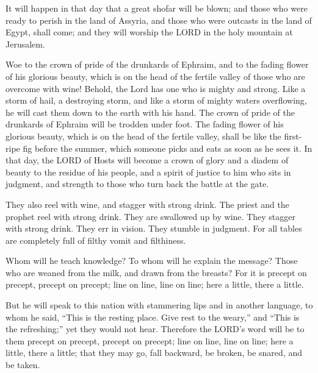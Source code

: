 \myverse{}It will happen in that day that a great shofar will be blown;
and those who were ready to perish in the land of Assyria, and those who were outcasts in the land of
Egypt, shall come; and they will worship the LORD in the holy mountain at Jerusalem.


\mychapter{} \myverse*{}Woe to the crown of pride of the drunkards of Ephraim, and to
the fading flower of his glorious beauty, which is on the head of the fertile valley of those who are
overcome with wine!
\myverse{}Behold, the Lord has one who is mighty and strong. Like a storm of hail, a
destroying storm, and like a storm of mighty waters overflowing, he will cast them down to the earth with
his hand.
\myverse{}The crown of pride of the drunkards of Ephraim will be trodden under foot.
\myverse{}The fading flower of his glorious beauty, which is on the head of the fertile
valley, shall be like the first-ripe fig before the summer, which someone picks and eats as soon as he
sees it.
\myverse{}In that day, the LORD of Hosts will become a crown of glory and a diadem of
beauty to the residue of his people,
\myverse{}and a spirit of justice to him who sits in judgment, and strength to those
who turn back the battle at the gate.

\myverse{}They also reel with wine, and stagger with strong drink. The priest
and the prophet reel with strong drink. They are swallowed up by wine. They stagger with strong drink.
They err in vision. They stumble in judgment.
\myverse{}For all tables are completely full of filthy vomit and filthiness.

\myverse{}Whom will he teach knowledge? To whom will he explain the message?
Those who are weaned from the milk, and drawn from the breasts?
\myverse{}For it is precept on precept, precept on precept; line on line, line on line;
here a little, there a little.

\myverse{}But he will speak to this nation with stammering lips and in
another language,
\myverse{}to whom he said, “This is the resting place. Give rest to the weary,” and
“This is the refreshing;” yet they would not hear.
\myverse{}Therefore the LORD’s word will be to them precept on precept, precept on
precept; line on line, line on line; here a little, there a little; that they may go, fall backward, be
broken, be snared, and be taken.


